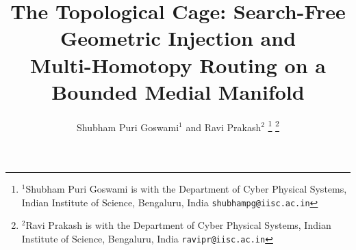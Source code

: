 \documentclass[conference]{IEEEtran}
\begin{document}
\title{\LARGE \bf
The Topological Cage: Search-Free Geometric Injection and \\
Multi-Homotopy Routing on a Bounded Medial Manifold
}
\author{Shubham Puri Goswami$^{1}$ and Ravi Prakash$^{2}$%
\thanks{$^{1}$Shubham Puri Goswami is with the Department of Cyber Physical Systems, Indian Institute of Science, Bengaluru, India {\tt\small shubhampg@iisc.ac.in}}%
\thanks{$^{2}$Ravi Prakash is with the Department of Cyber Physical Systems, Indian Institute of Science, Bengaluru, India {\tt\small ravipr@iisc.ac.in}}%
}
\maketitle
\thispagestyle{empty}
\pagestyle{empty}
\end{document}
